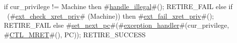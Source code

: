 if   cur_privilege != Machine
then { #\hyperref[sailRISCVzhandlezyillegal]{handle\_illegal}#(); RETIRE_FAIL }
else if ~(#\hyperref[sailRISCVzextzycheckzyxretzypriv]{ext\_check\_xret\_priv}# (Machine))
then { #\hyperref[sailRISCVzextzyfailzyxretzypriv]{ext\_fail\_xret\_priv}#(); RETIRE_FAIL }
else {
  #\hyperref[sailRISCVzsetzynextzypc]{set\_next\_pc}#(#\hyperref[sailRISCVzexceptionzyhandler]{exception\_handler}#(cur_privilege, #\hyperref[sailRISCVzCTLzyMRET]{CTL\_MRET}#(), PC));
  RETIRE_SUCCESS
}
